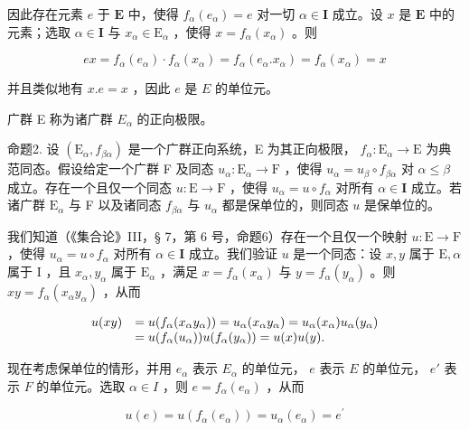 因此存在元素 \(e\) 于 \(\mathbf{E}\) 中，使得 \(f_{\alpha}(e_{\alpha}) = e\) 对一切 \(\alpha \in \mathbf{I}\) 成立。设 \(x\) 是 \(\mathbf{E}\) 中的元素；选取 \(\alpha \in \mathbf{I}\) 与 \(x_{\alpha} \in \mathrm{E}_{\alpha}\) ，使得 \(x = f_{\alpha}(x_{\alpha})\) 。则

\[
e x = f _ {\alpha} (e _ {\alpha}) \cdot f _ {\alpha} (x _ {\alpha}) = f _ {\alpha} (e _ {\alpha}. x _ {\alpha}) = f _ {\alpha} (x _ {\alpha}) = x
\]

并且类似地有 \(x.e = x\) ，因此 \(e\) 是 \(E\) 的单位元。

广群 E 称为诸广群 \(E_{\alpha}\) 的正向极限。

命题2. 设 \((\mathrm{E}_{\alpha}, f_{\beta \alpha})\) 是一个广群正向系统，E 为其正向极限， \(f_{\alpha} \colon \mathrm{E}_{\alpha} \to \mathrm{E}\) 为典范同态。假设给定一个广群 F 及同态 \(u_{\alpha} \colon \mathrm{E}_{\alpha} \to \mathrm{F}\) ，使得 \(u_{\alpha} = u_{\beta} \circ f_{\beta \alpha}\) 对 \(\alpha \leqslant \beta\) 成立。存在一个且仅一个同态 \(u \colon \mathrm{E} \to \mathrm{F}\) ，使得 \(u_{\alpha} = u \circ f_{\alpha}\) 对所有 \(\alpha \in \mathbf{I}\) 成立。若诸广群 \(\mathrm{E}_{\alpha}\) 与 F 以及诸同态 \(f_{\beta \alpha}\) 与 \(u_{\alpha}\) 都是保单位的，则同态 \(u\) 是保单位的。

我们知道（《集合论》III，§ 7，第 6 号，命题6）存在一个且仅一个映射 \(u: \mathrm{E} \to \mathrm{F}\) ，使得 \(u_{\alpha} = u \circ f_{\alpha}\) 对所有 \(\alpha \in \mathbf{I}\) 成立。我们验证 \(u\) 是一个同态：设 \(x, y\) 属于 \(\mathrm{E}, \alpha\) 属于 \(\mathrm{I}\) ，且 \(x_{\alpha}, y_{\alpha}\) 属于 \(\mathrm{E}_{\alpha}\) ，满足 \(x = f_{\alpha}(x_{\alpha})\) 与 \(y = f_{\alpha}(y_{\alpha})\) 。则 \(xy = f_{\alpha}(x_{\alpha}y_{\alpha})\) ，从而

\[
\begin{array}{r l} u (x y) & = u (f _ {\alpha} (x _ {\alpha} y _ {\alpha})) = u _ {\alpha} (x _ {\alpha} y _ {\alpha}) = u _ {\alpha} (x _ {\alpha}) u _ {\alpha} (y _ {\alpha}) \\ & = u (f _ {\alpha} (u _ {\alpha})) u (f _ {\alpha} (y _ {\alpha})) = u (x) u (y). \end{array}
\]

现在考虑保单位的情形，并用 \(e_{\alpha}\) 表示 \(E_{\alpha}\) 的单位元， \(e\) 表示 \(E\) 的单位元， \(e'\) 表示 \(F\) 的单位元。选取 \(\alpha \in I\) ，则 \(e = f_{\alpha}(e_{\alpha})\) ，从而

\[
u (e) = u \left(f _ {\alpha} \left(e _ {\alpha}\right)\right) = u _ {\alpha} \left(e _ {\alpha}\right) = e ^ {\prime}
\]

